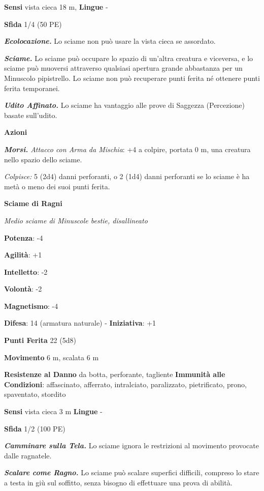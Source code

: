 \begin{multicols}{2}
\textbf{Sensi} vista cieca 18 m,  \textbf{Lingue} -

\textbf{Sfida} 1/4 (50 PE)\smallskip

\emph{\textbf{Ecolocazione.}} Lo sciame non può usare la vista cieca se
assordato.

\emph{\textbf{Sciame.}} Lo sciame può occupare lo spazio di un'altra
creatura e viceversa, e lo sciame può muoversi attraverso qualsiasi
apertura grande abbastanza per un Minuscolo pipistrello. Lo sciame non
può recuperare punti ferita né ottenere punti ferita temporanei.

\emph{\textbf{Udito Affinato.}} Lo sciame ha vantaggio alle prove di
Saggezza (Percezione) basate sull'udito.

\smallskip\textbf{Azioni}

\emph{\textbf{Morsi.} Attacco con Arma da Mischia}: +4 a colpire,
portata 0 m, una creatura nello spazio dello sciame.

\emph{Colpisce:} 5 (2d4) danni perforanti, o 2 (1d4) danni perforanti se
lo sciame è ha metà o meno dei suoi punti ferita.

\textbf{Sciame di Ragni}

\emph{Medio sciame di Minuscole bestie, disallineato}

\textbf{Potenza}: -4

\textbf{Agilità}: +1

\textbf{Intelletto}: -2

\textbf{Volontà}: -2

\textbf{Magnetismo}: -4

\textbf{Difesa}: 14 (armatura naturale) - \textbf{Iniziativa}: +1

\textbf{Punti Ferita} 22 (5d8)

\textbf{Movimento} 6 m, scalata 6 m

\textbf{Resistenze al Danno} da botta, perforante, tagliente
\textbf{Immunità alle Condizioni}: affascinato, afferrato, intralciato,
paralizzato, pietrificato, prono, spaventato, stordito

\textbf{Sensi} vista cieca 3 m \textbf{Lingue} -

\textbf{Sfida} 1/2 (100 PE)\smallskip

\emph{\textbf{Camminare sulla Tela.}} Lo sciame ignora le restrizioni al
movimento provocate dalle ragnatele.

\emph{\textbf{Scalare come Ragno.}} Lo sciame può scalare superfici
difficili, compreso lo stare a testa in giù sul soffitto, senza bisogno
di effettuare una prova di abilità.


\end{multicols}
